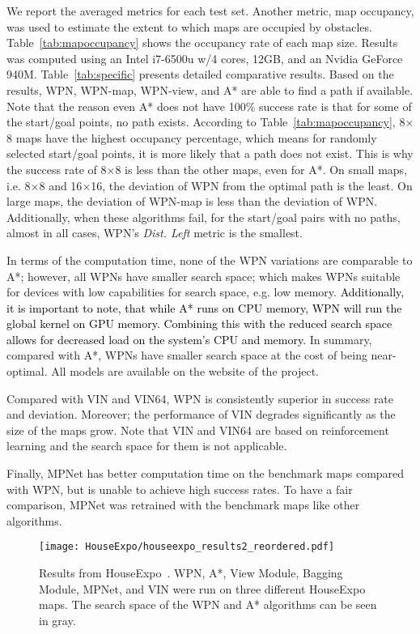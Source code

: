 \documentclass[journal, twocolumn]{IEEEtran}
\begin{document}
We report the averaged metrics for each test set. Another metric, map occupancy, was used to estimate the extent to which maps are occupied by obstacles. Table~\ref{tab:mapoccupancy} shows the occupancy rate of each map size. Results was computed using an Intel i7-6500u w/4 cores, 12GB, and an Nvidia GeForce 940M. Table~\ref{tab:specific} presents detailed comparative results.
Based on the results, WPN, WPN-map, WPN-view, and A* are able to find a path if available. Note that the reason even A* does not have 100\% success rate is that for some of the start/goal points, no path exists. According to Table~\ref{tab:mapoccupancy}, 8$\times$8 maps have the highest occupancy percentage, which means for randomly selected start/goal points, it is more likely that a path does not exist. This is why the success rate of 8$\times$8 is less than the other maps, even for A*. 
On small maps, i.e. 8$\times$8 and 
16$\times$16, the deviation of WPN from the optimal path is the least. On large maps, the deviation of WPN-map is less than the deviation of WPN. 
%
Additionally, when these algorithms fail, for the start/goal pairs with no paths, almost in all cases, WPN's \emph{Dist. Left} metric is the smallest. 

%
In terms of the computation time, none of the WPN variations are comparable to A*; however, all WPNs have smaller search space; which makes WPNs suitable for devices with low capabilities for search space, e.g. low memory. \textcolor{black}{Additionally, it is important to note, that while A* runs on CPU memory, WPN will run the global kernel on GPU memory. Combining this with the reduced search space allows for decreased load on the system's CPU and memory.} In summary, compared with A*, WPNs have smaller search space at the cost of being near-optimal. All models are available on the website of the project.

Compared with VIN and VIN64, WPN is consistently superior in success rate and deviation. Moreover; the performance of VIN degrades significantly as the size of the maps grow. Note that VIN and VIN64 are based on reinforcement learning and the search space for them is not applicable.

Finally, MPNet has better computation time on the benchmark maps compared with WPN, but is unable to achieve high success rates. To have a fair comparison, MPNet was retrained with the benchmark maps like other algorithms.

\begin{figure*}[]
    \centering
    \texttt{[image: HouseExpo/houseexpo\_results2\_reordered.pdf]}
    \caption{Results from HouseExpo~\cite{houseexpo}. WPN, A*, View Module, Bagging Module, MPNet, and VIN were run on three different HouseExpo maps. The search space of the WPN and A* algorithms can be seen in gray.}
    \vspace{-5 mm}
      \label{fig:he_maps}  
\end{figure*}
\end{document}
